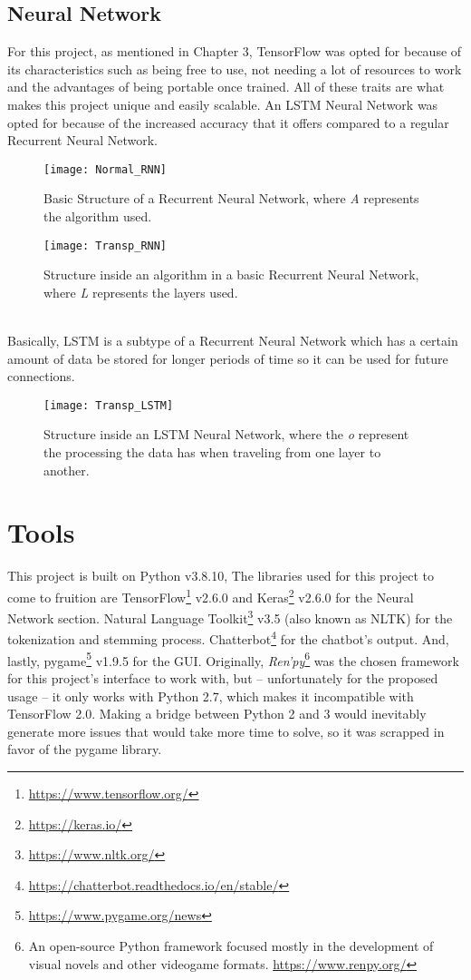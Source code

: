 \subsection{Neural Network}
For this project, as mentioned in Chapter 3, TensorFlow was opted for because of its characteristics such as being free to use, not needing a lot of resources to work and the advantages of being portable once trained. All of these traits are what makes this project unique and easily scalable.
An LSTM Neural Network was opted for because of the increased accuracy that it offers compared to a regular Recurrent Neural Network.
\begin{figure}[!ht]
	\centering
	\texttt{[image: Normal\_RNN]}
	\caption{Basic Structure of a Recurrent Neural Network, where \textit{A} represents the algorithm used.}
	\label{fig:neuraldiagram_1}
	\texttt{[image: Transp\_RNN]}
	\caption{Structure inside an algorithm in a basic Recurrent Neural Network, where \textit{L} represents the layers used.}
	\label{fig:neuraldiagram_2}
\end{figure}
\\Basically, LSTM is a subtype of a Recurrent Neural Network which has a certain amount of data be stored for longer periods of time so it can be used for future connections.
\begin{figure}[!ht]
	\centering
	\texttt{[image: Transp\_LSTM]}
	\caption{Structure inside an LSTM Neural Network, where the \textit{o} represent the processing the data has when traveling from one layer to another.}
	\label{fig:neuraldiagram_3}
\end{figure}
\pagebreak
\section{Tools}
This project is built on Python v3.8.10, The libraries used for this project to come to fruition are TensorFlow\footnote{\url{https://www.tensorflow.org/}} v2.6.0 and Keras\footnote{\url{https://keras.io/}} v2.6.0 for the Neural Network section. Natural Language Toolkit\footnote{\url{https://www.nltk.org/}} v3.5 (also known as NLTK) for the tokenization and stemming process. Chatterbot\footnote{\url{https://chatterbot.readthedocs.io/en/stable/}} for the chatbot's output. And, lastly, pygame\footnote{\url{https://www.pygame.org/news}} v1.9.5 for the GUI.
Originally, \textit{Ren'py}\footnote{An open-source Python framework focused mostly in the development of visual novels and other videogame formats. \url{https://www.renpy.org/}} was the chosen framework for this project's interface to work with, but -- unfortunately for the proposed usage -- it only works with Python 2.7, which makes it incompatible with TensorFlow 2.0. Making a bridge between Python 2 and 3 would inevitably generate more issues that would take more time to solve, so it was scrapped in favor of the pygame library.

